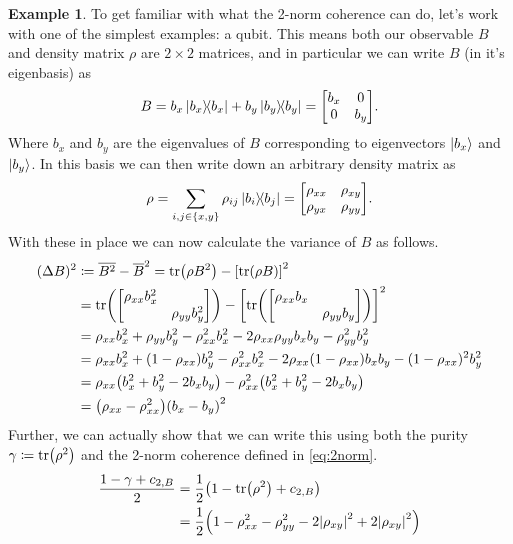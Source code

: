 \documentclass[11pt,english]{article}
\theoremstyle{definition}
\newtheorem{example}{Example}[section]
\newcommand{\twonormE}[1][\rho]{c_{2,B}}
\begin{document}
\begin{example}\label{ex:qubits}
	To get familiar with what the 2-norm coherence can do, let's work with one of the simplest examples: a qubit. This means both our observable $B$ and density matrix $\rho$ are $2\times 2$ matrices, and in particular we can write $B$ (in it's eigenbasis) as
	\begin{equation*}
		B = b_x\ketbra{b_x} + b_y\ketbra{b_y} = \mqty[b_x & 0 \\ 0 & b_y].
	\end{equation*}
	Where $b_x$ and $b_y$ are the eigenvalues of $B$ corresponding to eigenvectors $\ket{b_x}$ and $\ket{b_y}$. In this basis we can then write down an arbitrary density matrix as
	\begin{equation*}
		\rho = \sum_{i, j\in \{x, y\}}\rho_{ij}\ketbra{b_i}{b_j} = \mqty[\rho_{xx} & \rho_{xy} \\ \rho_{yx} & \rho_{yy}].
	\end{equation*}
	With these in place we can now calculate the variance of $B$ as follows.
	\begin{align*}
		(\Delta B)^2 & \coloneqq \overline{B^2} - \overline{B}^2 = \tr(\rho B^2) - \qty[\tr(\rho B)]^2                                        \\
		             & = \tr(\mqty[\dmat{\rho_{xx}b_x^2, \rho_{yy}b_y^2}]) - \qty[\tr(\mqty[\dmat{\rho_{xx}b_x, \rho_{yy}b_y}])]^2            \\
		             & = \rho_{xx}b_x^2 + \rho_{yy}b_y^2 - \rho_{xx}^2b_x^2 - 2\rho_{xx}\rho_{yy}b_x b_y - \rho_{yy}^2b_y^2                   \\
		             & = \rho_{xx}b_x^2 + (1 - \rho_{xx})b_y^2 - \rho_{xx}^2b_x^2 - 2\rho_{xx}(1 - \rho_{xx})b_x b_y - (1 - \rho_{xx})^2b_y^2 \\
		             & = \rho_{xx}\qty(b_x^2 + b_y^2 - 2b_x b_y) - \rho_{xx}^2\qty(b_x^2 + b_y^2 - 2b_x b_y)                                  \\
		             & = \qty(\rho_{xx} - \rho_{xx}^2)\qty(b_x - b_y)^2
	\end{align*}
	Further, we can actually show that we can write this using both the purity $\gamma\coloneqq\tr(\rho^2)$ and the 2-norm coherence defined in \cref{eq:2norm}.
	\begin{align*}
		\frac{1 - \gamma + \twonormE}{2} & = \frac{1}{2}\qty(1 - \tr(\rho^2) + \twonormE)                                             \\
		                                 & = \frac{1}{2}\qty(1 - \rho_{xx}^2 - \rho_{yy}^2 - 2\abs{\rho_{xy}}^2 + 2\abs{\rho_{xy}}^2) \\

\end{align*}
\end{example}
\end{document}
